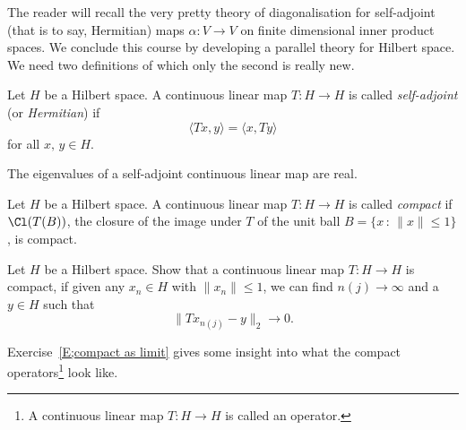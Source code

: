 The reader will recall the very pretty theory of diagonalisation
for self-adjoint (that is to say, Hermitian)
maps $\alpha:V\rightarrow V$ on finite dimensional
inner product spaces. We conclude this course by developing a parallel
theory for Hilbert space. We need two definitions of which
only the second is really new.
\begin{definition} Let $H$ be a Hilbert space. A continuous linear
map $T:H\rightarrow H$ is called \emph{self-adjoint}
(or \emph{Hermitian}) if
\[\langle Tx,y\rangle=\langle x,Ty\rangle\]
for all $x,\,y\in H$.
\end{definition}
\begin{exercise} The eigenvalues of a self-adjoint 
continuous linear map are real.
\end{exercise}
\begin{definition}\label{D;compact} 
Let $H$ be a Hilbert space. A continuous linear
map $T:H\rightarrow H$ is called \emph{compact} if 
$\Cl(T(B))$,
the closure of the image under $T$ of the unit ball
$B=\{x\,:\,\|x\|\leq 1\}$, is compact.
\end{definition}
\begin{exercise}  Let $H$ be a Hilbert space. 
Show that a continuous linear
map $T:H\rightarrow H$ is compact, if given any $x_{n}\in H$
with $\|x_{n}\|\leq 1$,
we can find $n(j)\rightarrow\infty$ and a $y\in H$ such that
\[\|Tx_{n(j)}-y\|_{2}\rightarrow 0.\]
\end{exercise}
Exercise~\ref{E;compact as limit} gives some insight into 
what the compact operators\footnote{A continuous linear
map $T:H\rightarrow H$ is called an operator.} look like.
 
